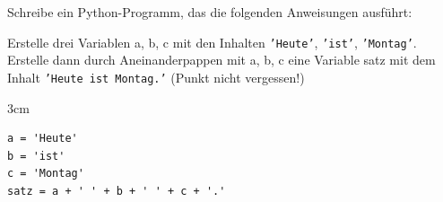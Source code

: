 \question[3]
Schreibe ein Python-Programm, das die folgenden Anweisungen ausführt:

Erstelle drei Variablen a, b, c mit den Inhalten \texttt{'Heute'}, \texttt{'ist'}, \texttt{'Montag'}.
Erstelle dann durch Aneinanderpappen mit a, b, c eine Variable satz
mit dem Inhalt \texttt{'Heute ist Montag.'} (Punkt nicht vergessen!)

\begin{solutionbox}{3cm}
\begin{lstlisting}
a = 'Heute'
b = 'ist'
c = 'Montag'
satz = a + ' ' + b + ' ' + c + '.'
\end{lstlisting}
\end{solutionbox}